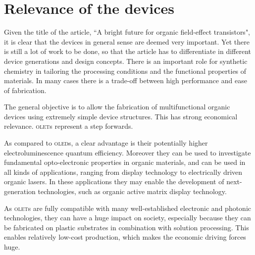 \section{Relevance of the devices}

Given the title of the article, ``A bright future for organic field-effect transistors", it is clear that the devices in general sense are deemed very important. Yet there is still a lot of work to be done, so that the article has to differentiate in different device generations and design concepts. There is an important role for synthetic chemistry in tailoring the processing conditions and the functional properties of materials. In many cases there is a trade-off between high performance and ease of fabrication.

The general objective is to allow the fabrication of multifunctional organic devices using extremely simple device structures. This has strong economical relevance. \textsc{olet}s represent a step forwards.

As compared to \textsc{oled}s, a clear advantage is their potentially higher electroluminescence quantum efficiency. Moreover they can be used to investigate fundamental opto-electronic properties in organic materials, and can be used in all kinds of applications, ranging from display technology to electrically driven organic lasers. In these applications they may enable the development of next-generation technologies, such as organic active matrix display technology.

As \textsc{olet}s are fully compatible with many well-established electronic and photonic technologies, they can have a huge impact on society, especially because they can be fabricated on plastic substrates in combination with solution processing. This enables relatively low-cost production, which makes the economic driving forces huge.